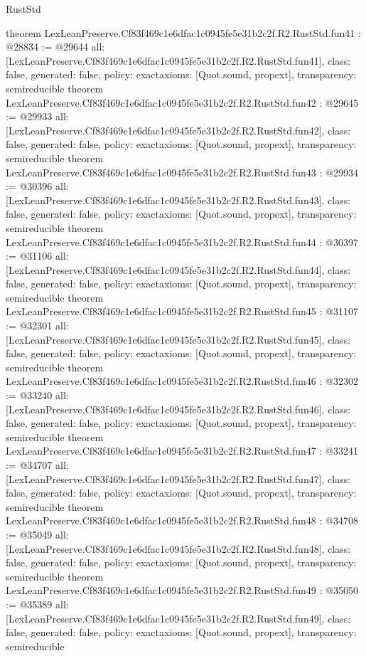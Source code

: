 \begin{lexlean}{RustStd}
\begin{coremodule}
{}
theorem LexLeanPreserve.Cf83f469c1e6dfac1c0945fe5e31b2c2f.R2.RustStd.fun41 : @28834 := @29644 {
  all: [LexLeanPreserve.Cf83f469c1e6dfac1c0945fe5e31b2c2f.R2.RustStd.fun41],
  class: false,
  generated: false,
  policy: exact{axioms: [Quot.sound, propext]},
  transparency: semireducible
}
theorem LexLeanPreserve.Cf83f469c1e6dfac1c0945fe5e31b2c2f.R2.RustStd.fun42 : @29645 := @29933 {
  all: [LexLeanPreserve.Cf83f469c1e6dfac1c0945fe5e31b2c2f.R2.RustStd.fun42],
  class: false,
  generated: false,
  policy: exact{axioms: [Quot.sound, propext]},
  transparency: semireducible
}
theorem LexLeanPreserve.Cf83f469c1e6dfac1c0945fe5e31b2c2f.R2.RustStd.fun43 : @29934 := @30396 {
  all: [LexLeanPreserve.Cf83f469c1e6dfac1c0945fe5e31b2c2f.R2.RustStd.fun43],
  class: false,
  generated: false,
  policy: exact{axioms: [Quot.sound, propext]},
  transparency: semireducible
}
theorem LexLeanPreserve.Cf83f469c1e6dfac1c0945fe5e31b2c2f.R2.RustStd.fun44 : @30397 := @31106 {
  all: [LexLeanPreserve.Cf83f469c1e6dfac1c0945fe5e31b2c2f.R2.RustStd.fun44],
  class: false,
  generated: false,
  policy: exact{axioms: [Quot.sound, propext]},
  transparency: semireducible
}
theorem LexLeanPreserve.Cf83f469c1e6dfac1c0945fe5e31b2c2f.R2.RustStd.fun45 : @31107 := @32301 {
  all: [LexLeanPreserve.Cf83f469c1e6dfac1c0945fe5e31b2c2f.R2.RustStd.fun45],
  class: false,
  generated: false,
  policy: exact{axioms: [Quot.sound, propext]},
  transparency: semireducible
}
theorem LexLeanPreserve.Cf83f469c1e6dfac1c0945fe5e31b2c2f.R2.RustStd.fun46 : @32302 := @33240 {
  all: [LexLeanPreserve.Cf83f469c1e6dfac1c0945fe5e31b2c2f.R2.RustStd.fun46],
  class: false,
  generated: false,
  policy: exact{axioms: [Quot.sound, propext]},
  transparency: semireducible
}
theorem LexLeanPreserve.Cf83f469c1e6dfac1c0945fe5e31b2c2f.R2.RustStd.fun47 : @33241 := @34707 {
  all: [LexLeanPreserve.Cf83f469c1e6dfac1c0945fe5e31b2c2f.R2.RustStd.fun47],
  class: false,
  generated: false,
  policy: exact{axioms: [Quot.sound, propext]},
  transparency: semireducible
}
theorem LexLeanPreserve.Cf83f469c1e6dfac1c0945fe5e31b2c2f.R2.RustStd.fun48 : @34708 := @35049 {
  all: [LexLeanPreserve.Cf83f469c1e6dfac1c0945fe5e31b2c2f.R2.RustStd.fun48],
  class: false,
  generated: false,
  policy: exact{axioms: [Quot.sound, propext]},
  transparency: semireducible
}
theorem LexLeanPreserve.Cf83f469c1e6dfac1c0945fe5e31b2c2f.R2.RustStd.fun49 : @35050 := @35389 {
  all: [LexLeanPreserve.Cf83f469c1e6dfac1c0945fe5e31b2c2f.R2.RustStd.fun49],
  class: false,
  generated: false,
  policy: exact{axioms: [Quot.sound, propext]},
  transparency: semireducible
}
\end{coremodule}
\end{lexlean}
